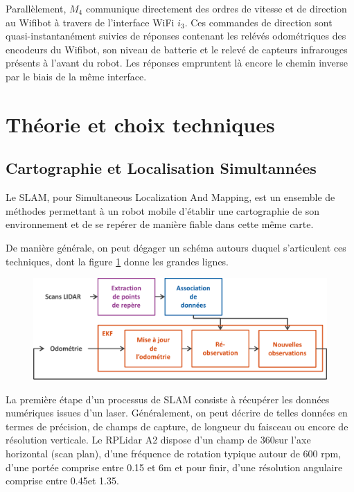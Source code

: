 Parallèlement, $M_{4}$ communique directement des ordres de vitesse et de direction au Wifibot à travers de l'interface WiFi $i_{3}$. 
Ces commandes de direction sont quasi-instantanément suivies de réponses contenant les relévés odométriques des encodeurs du Wifibot, son niveau de batterie et le relevé de capteurs infrarouges présents 
à l'avant du robot. Les réponses empruntent là encore le chemin inverse par le biais de la même interface. 

\section{Théorie et choix techniques}

  \subsection{Cartographie et Localisation Simultannées}
  
Le SLAM, pour Simultaneous Localization And Mapping, est un ensemble de méthodes permettant à un robot mobile d'établir une cartographie de son environnement et de se repérer de manière fiable dans cette même carte. 
 
De manière générale, on peut dégager un schéma autours duquel s'articulent ces techniques, dont la figure \ref{fig:slam-proc} donne les grandes lignes.

\begin{figure}[h]
  \centering
    \includegraphics[width=.8\linewidth]{figures/slam-proc-h}  
  \label{fig:slam-proc}
\end{figure}

La première étape d'un processus de SLAM consiste à récupérer les données numériques issues d'un laser. 
Généralement, on peut décrire de telles données en termes de précision, de champs de capture, de longueur du faisceau ou encore de résolution verticale. 
Le RPLidar A2 dispose d'un champ de 360\degre sur l'axe horizontal (scan plan), d'une fréquence de rotation typique autour de 600 rpm, d'une portée comprise entre 0.15 et 6m et pour finir, d'une résolution angulaire comprise entre 
0.45\degre et 1.35\degre.

